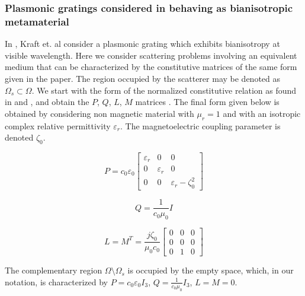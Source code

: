\subsubsection{Plasmonic gratings considered in \cite{pendry2016acsphotonics} behaving as bianisotropic metamaterial}
In  \cite{pendry2016acsphotonics}, Kraft et. al consider a plasmonic grating 
which exhibits bianisotropy at visible wavelength.
Here we consider scattering problems involving an equivalent medium 
that can be characterized by the constitutive matrices of the same form 
given in the paper.
The region occupied by the scatterer may be denoted as $\Omega_s \subset \Omega$. 
We start with the form of the normalized constitutive relation as found in 
\cite{chen2005retrieval} and \cite{li2009determination}, 
and obtain the $P$, $Q$, $L$, $M$ matrices \cite{noiregolarita}.
The final form given below is obtained by considering 
non magnetic material with 
$\mu_r=1$ and with an isotropic complex relative permittivity $\varepsilon_r$. 
The magnetoelectric coupling parameter is denoted $\zeta_0$. 

\begin{equation}  \label{constitutive_kraft_P}
P = c_0 \varepsilon_0 
\begin{bmatrix}
\varepsilon_r & 0 & 0 \\
0 &  \varepsilon_r & 0 \\
0 & 0 & \varepsilon_r-\zeta_0^2
\end{bmatrix} 
\end{equation}

\begin{equation} \label{constitutive_kraft_Q}
Q = \frac{1}{c_0\mu_0}I
\end{equation}

\begin{equation} \label{constitutive_kraft_LM}
L = M^T = \frac{j\zeta_0}{\mu_0 c_0}
\begin{bmatrix}
0 & 0 & 0 \\
0 & 0 & 0 \\
0 &  1  & 0
\end{bmatrix} 
\end{equation}
 
The complementary region $\Omega \setminus \Omega_s$ is 
occupied by the empty space, which,  in our notation, is characterized by 
 $P=c_0\varepsilon_0I_3$, $Q=\frac{1}{c_0\mu_0}I_3$, $L=M=0$.


